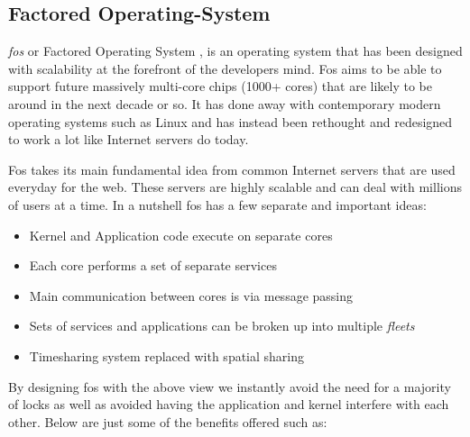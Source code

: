 \documentclass[journal]{IEEEtran}
\begin{document}
\subsection{Factored Operating-System}

\emph{fos} or Factored Operating System \cite{fos}, is an operating system that has been designed with scalability at the forefront of the developers mind. Fos aims to be able to support future massively multi-core chips (1000+ cores) that are likely to be around in the next decade or so. It has done away with contemporary modern operating systems such as Linux and has instead been rethought and redesigned to work a lot like Internet servers do today.

Fos takes its main fundamental idea from common Internet servers that are used everyday for the web. These servers are highly scalable and can deal with millions of users at a time. In a nutshell fos has a few separate and important ideas:

\vspace{2 mm}

\begin{itemize}
\item Kernel and Application code execute on separate cores
\item Each core performs a set of separate services
\item Main communication between cores is via message passing
\item Sets of services and applications can be broken up into multiple \emph{fleets}
\item Timesharing system replaced with spatial sharing
\end{itemize}

\vspace{5 mm}

By designing fos with the above view we instantly avoid the need for a majority of locks as well as avoided having the application and kernel interfere with each other. Below are just some of the benefits offered such as:

\vspace{2 mm}
\end{document}

